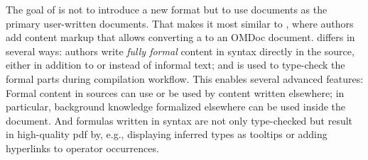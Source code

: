 The goal of \mmttex is not to introduce a new format but to use \latex documents as the primary user-written documents.
That makes it most similar to \sTeX \cite{stex}, where authors add content markup that allows converting a \latex to an OMDoc document.
\mmttex differs in several ways: authors write \emph{fully formal} content in \mmt syntax \cite{RK:mmt:10} directly in the \latex source, either in addition to or instead of informal text; and \mmt is used to type-check the formal parts during \latex compilation workflow.
This enables several advanced features:
Formal content in \latex sources can use or be used by \mmt content written elsewhere; in particular, background knowledge formalized elsewhere can be used inside the \latex document.
And formulas written in \mmt syntax are not only type-checked but result in high-quality pdf by, e.g., displaying inferred types as tooltips or adding hyperlinks to operator occurrences.


